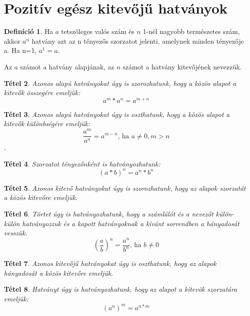 \documentclass[twoside,12pt]{report}
\newtheorem{theorem}{Tétel}[section]
\theoremstyle{definition}
\newtheorem{definition}[theorem]{Definíció}
\begin{document}
\section{Pozitív egész kitevőjű hatványok}
	\begin{definition}
		Ha $a$ tetszőleges valós szám és $n$ 1-nél nagyobb természetes szám, akkor $a^n$ hatvány
		azt az n tényezős szorzatot jelenti, amelynek minden tényezője a. Ha n=1, $a^1=a$.
	\end{definition}
	Az $a$ számot a hatvány alapjának, az $n$ számot a hatvány kitevőjének nevezzük.
	\begin{theorem}
		Azonos alapú hatványokat úgy is szorozhatunk, hogy a közös alapot a kitevők összegére
		emeljük: 
		\begin{equation*}
			a^m*a^n=a^{m+n}
		\end{equation*}
	\end{theorem}
	\begin{theorem}
		Azonos alapú hatványokat úgy is oszthatunk, hogy a közös alapot a kitevők különbségére
		emeljük: 
		\begin{equation*}
			\frac{a^m}{a^n}=a^{m-n}\text{, ha } a\ne0, m>n
		\end{equation*}.
	\end{theorem}
	\begin{theorem}
		Szorzatot tényezőnként is hatványozhatunk: 
		\begin{equation*}
			(a*b)^n=a^n*b^n
		\end{equation*}
	\end{theorem}
	\begin{theorem}
		Azonos kitevő hatványokat úgy is szorozhatunk, hogy az alapok szorzatát a közös kitevőre emeljük.
	\end{theorem}
	\begin{theorem}
		Törtet úgy is hatványozhatunk, hogy a számlálót és a nevezőt külön-külön hatványozzuk
		és a kapott hatványoknak a kívánt sorrendben a hányadosát vesszük. 
		\begin{equation*}
			\left(\frac{a}{b}\right)^n=\frac{a^n}{b^n}\text{, ha }b\ne0
		\end{equation*}
	\end{theorem}
	\begin{theorem}
		Azonos kitevőjű hatványokat úgy is oszthatunk, hogy az alapok hányadosát a közös kitevőre emeljük.
	\end{theorem}
	\begin{theorem}
		Hatványt úgy is hatványozhatunk, hogy az alapot a kitevõk szorzatára emeljük:
		\begin{equation*}
			\left(a^n\right)^m=a^{n*m}
		\end{equation*}
	\end{theorem}
\end{document}
